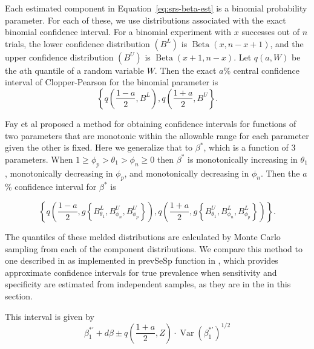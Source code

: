 \documentclass[AMA,STIX1COL]{WileyNJD-v2}
\DeclareMathOperator{\Var}{Var}
\begin{document}
Each estimated component in Equation~\ref{eq:srs-beta-est} is a binomial probability parameter.
For each of these, we use distributions associated with  the exact binomial confidence interval.
For a binomial experiment with \( x \) successes out of \( n \) trials, the lower confidence distribution \( (B^L) \) is \( \operatorname{Beta}(x, n - x + 1) \), and the upper confidence distribution \( (B^U) \) is \( \operatorname{Beta}(x + 1, n - x)\).
Let \( q(a, W) \) be the \( a \)th quantile of a random variable \( W \). Then the exact \( a \)\% central confidence interval of Clopper-Pearson for the binomial parameter is 
\[
\left\{ q \left( \frac{1-a}{2}, B^L \right), q \left( \frac{1+a}{2}, B^U \right\}.
\]

Fay et al \cite{FayP:2015} proposed a method for obtaining confidence intervals for functions of two parameters that are monotonic within the allowable range  for each parameter given the other is fixed. Here we generalize that to $\beta^*$, which is a function of 3 parameters. When $1 \geq \phi_p > \theta_1 > \phi_n \geq 0$ then $\beta^*$ is monotonically increasing in $\theta_1$, monotonically decreasing in $\phi_p$, and monotonically decreasing in $\phi_n$.
Then the \( a \)\% confidence interval for \( \beta^* \) is 

\begin{equation}
    \left\{ q \left( \frac{1 - a}{2}, g \left\{ B_{\theta_1}^L, B_{\phi_n}^U, B_{\phi_p}^U \right\}   \right),  
            q \left( \frac{1 + a}{2},  g \left\{ B_{\theta_1}^U, B_{\phi_n}^L, B_{\phi_p}^L \right\}   \right) \right\}.
\label{eq:srs-conf-int}
\end{equation}



The quantiles of these melded distributions are calculated by Monte Carlo sampling from each of the component distributions.
We compare this method to one described in \cite{Lang:2014} as implemented in prevSeSp function in \cite{asht}, which provides approximate confidence intervals for true prevalence when sensitivity and specificity are estimated from independent samples, as they are in the in this section.

This interval is given by
\begin{equation}
\beta_1^{*\prime} + d\beta \pm q\left( \frac{1 + a}{2}, Z \right) \cdot \Var(\beta_1^{*\prime})^{1/2}    
\end{equation}
\end{document}
